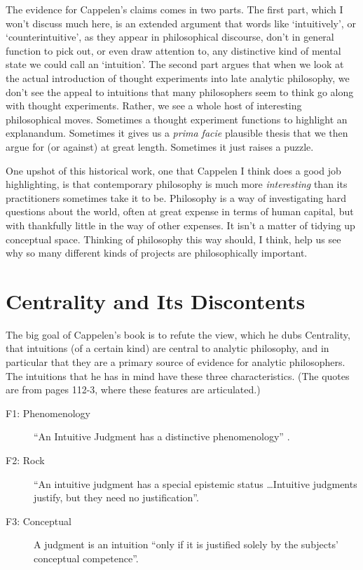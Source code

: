 The evidence for Cappelen's claims comes in two parts. The first part, which I won't discuss much here, is an extended argument that words like `intuitively', or `counterintuitive', as they appear in philosophical discourse, don't in general function to pick out, or even draw attention to, any distinctive kind of mental state we could call an `intuition'. The second part argues that when we look at the actual introduction of thought experiments into late analytic philosophy, we don't see the appeal to intuitions that many philosophers seem to think go along with thought experiments. Rather, we see a whole host of interesting philosophical moves. Sometimes a thought experiment functions to highlight an explanandum. Sometimes it gives us a \textit{prima facie} plausible thesis that we then argue for (or against) at great length. Sometimes it just raises a puzzle.

One upshot of this historical work, one that Cappelen I think does a good job highlighting, is that contemporary philosophy is much more \textit{interesting} than its practitioners sometimes take it to be. Philosophy is a way of investigating hard questions about the world, often at great expense in terms of human capital, but with thankfully little in the way of other expenses. It isn't a matter of tidying up conceptual space. Thinking of philosophy this way should, I think, help us see why so many different kinds of projects are philosophically important.

\nocite{Cappelen2012}

\section{Centrality and Its Discontents}
\label{sec:Centrality}
The big goal of Cappelen's book is to refute the view, which he dubs Centrality, that intuitions (of a certain kind) are central to analytic philosophy, and in particular that they are a primary source of evidence for analytic philosophers. The intuitions that he has in mind have these three characteristics. (The quotes are from pages 112-3, where these features are articulated.)

\begin{description}
\item[F1: Phenomenology] ``An Intuitive Judgment has a distinctive phenomenology'' .
\item[F2: Rock] ``An intuitive judgment has a special epistemic status \dots Intuitive judgments justify, but they need no justification''.
\item[F3: Conceptual] A judgment is an intuition ``only if it is justified solely by the subjects' conceptual competence''.
\end{description}

